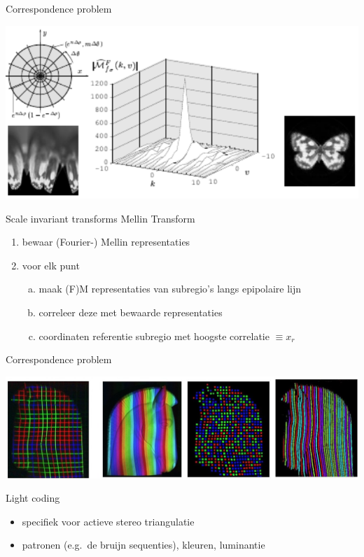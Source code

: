 \begin{frame}{Correspondence problem}
\centerline{\includegraphics[scale=0.50]{images/mellin1}}
\begin{block}{Scale invariant transforms}
Mellin Transform
\end{block}
\pause
\begin{enumerate}
\item<+-> bewaar (Fourier-) Mellin representaties
\item<+-> voor elk punt
\begin{enumerate}[a.]
\item<+-> maak (F)M representaties van subregio's langs epipolaire lijn
\item<+-> correleer deze met bewaarde representaties
\item<+-> coordinaten referentie subregio met hoogste correlatie $\equiv x_r$
\end{enumerate}
\end{enumerate}
\end{frame}

\begin{frame}{Correspondence problem}
\centerline{\includegraphics[scale=0.17]{structuredlight.jpg}}
\begin{block}{Light coding}
\begin{itemize}
\item specifiek voor actieve stereo triangulatie
\item patronen (e.g.\ de bruijn sequenties), kleuren, luminantie
\end{itemize}
\end{block}
\end{frame}

